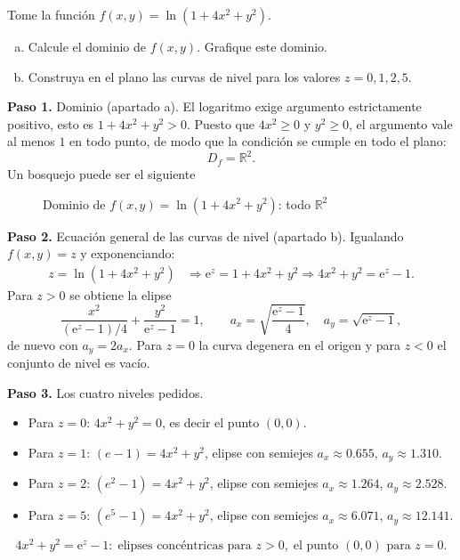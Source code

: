 \begin{prob}
Tome la función $f(x,y)=\ln\left(1+4x^2+y^2\right).$
\begin{enumerate}[(a)]
    \item Calcule el dominio de $f(x,y).$ Grafique este dominio.
    \item Construya en el plano las curvas de nivel para los valores $z=0,1,2,5.$
\end{enumerate}
\begin{myproof}
\textbf{Paso 1.} Dominio (apartado a). El logaritmo exige argumento
estrictamente positivo, esto es $1+4x^2+y^2>0.$ Puesto que $4x^2\geq 0$ y
$y^2\geq 0$, el argumento vale al menos $1$ en todo punto, de modo que la
condición se cumple en todo el plano:
\[
  \boxed{D_f=\mathbb{R}^2.}
\]
Un bosquejo puede ser el siguiente
\begin{figure}[H]
\centering
{}
\caption{Dominio de $f(x,y)=\ln(1+4x^2+y^2)$: todo $\mathbb{R}^2$}
\label{fig:dom_ln_4x2_y2}
\end{figure}
\textbf{Paso 2.} Ecuación general de las curvas de nivel (apartado b). Igualando
$f(x,y)=z$ y exponenciando:
\begin{align*}
z=\ln\left( 1+4x^2+y^2 \right)
&\Rightarrow \mathrm{e}^{z}=1+4x^2+y^2
\Rightarrow 4x^2+y^2=\mathrm{e}^{z}-1.
\end{align*}
Para $z>0$ se obtiene la elipse
\[
  \frac{x^2}{(\mathrm{e}^{z}-1)/4}+\frac{y^2}{\mathrm{e}^{z}-1}=1,
  \qquad a_x=\sqrt{\frac{\mathrm{e}^{z}-1}{4}},\quad a_y=\sqrt{\mathrm{e}^{z}-1},
\]
de nuevo con $a_y=2a_x$. Para $z=0$ la curva degenera en el origen y para $z<0$
el conjunto de nivel es vacío.

\textbf{Paso 3.} Los cuatro niveles pedidos.
\begin{itemize}
\item Para $z=0$: $4x^2+y^2=0$, es decir el punto $(0,0)$.
\item Para $z=1$: $(e-1) = 4x^2+y^2$, elipse con semiejes $a_x\approx 0.655$, $a_y\approx 1.310$.
\item Para $z=2$: $(e^2-1) = 4x^2+y^2$, elipse con semiejes $a_x\approx 1.264$, $a_y\approx 2.528$.
\item Para $z=5$: $(e^5-1) = 4x^2+y^2$, elipse con semiejes $a_x\approx 6.071$, $a_y\approx 12.141$.
\end{itemize}
\[
  \boxed{4x^2+y^2=\mathrm{e}^{z}-1:\;\text{elipses concéntricas para }z>0,\;
  \text{el punto }(0,0)\text{ para }z=0.}
\]


\end{myproof}
\end{prob}
